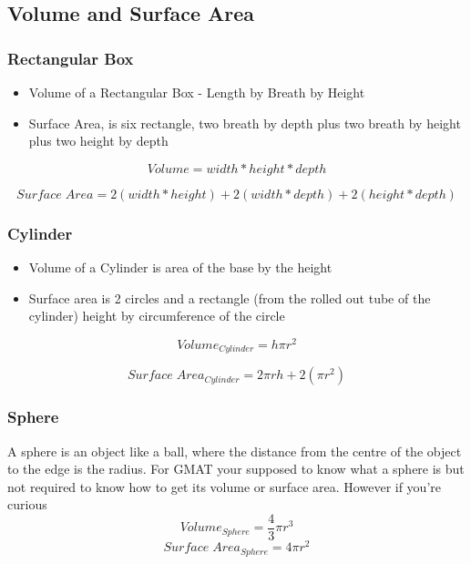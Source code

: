 \documentclass{article}
\begin{document}
\newpage
\subsection{Volume and Surface Area}
\subsubsection{Rectangular Box}
\begin{itemize}
\item Volume of a Rectangular Box - Length by Breath by Height
\item Surface Area, is six rectangle, two breath by depth plus two breath by height plus two height by depth
\end{itemize}

\begin{equation}
Volume = width * height * depth
\end{equation}

\begin{equation}
Surface\;Area = 2(width * height) + 2(width * depth) + 2(height * depth)
\end{equation}

\subsubsection{Cylinder}
\begin{itemize}
\item Volume of a Cylinder is area of the base by the height
\item Surface area is 2 circles and a rectangle (from the rolled out tube of the cylinder) height by circumference of the circle
\end{itemize}

\begin{equation}
Volume_{ Cylinder} = h \pi r^ 2
\end{equation}


\begin{equation}
Surface\;Area_{ Cylinder} = 2 \pi r h + 2(\pi r^ 2 )
\end{equation}

\subsubsection{Sphere}
A sphere is an object like a ball, where the distance from the centre of the object to the edge is the radius. For GMAT your supposed to know what a sphere is but not required to know how to get its volume or surface area.
However if you're curious 
\begin{equation}
Volume_{Sphere} = \frac{4}{3} \pi r^{3}
\end{equation}
\begin{equation}
Surface\;Area_{Sphere} = 4 \pi r^{2}
\end{equation}
\end{document}
